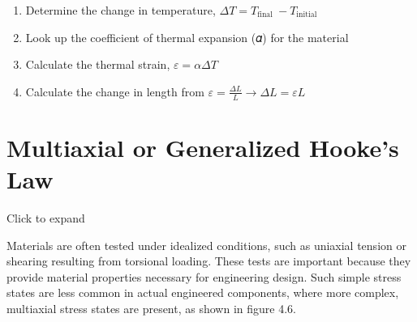 \documentclass[
  letterpaper,
  DIV=11,
  numbers=noendperiod]{scrreprt}
\begin{document}
\begin{tcolorbox}[enhanced jigsaw, breakable, opacityback=0, toptitle=1mm, left=2mm, colback=white, opacitybacktitle=0.6, colframe=quarto-callout-warning-color-frame, titlerule=0mm, arc=.35mm, leftrule=.75mm, bottomtitle=1mm, colbacktitle=quarto-callout-warning-color!10!white, rightrule=.15mm, title={Step-by-step: Thermal Strain}, bottomrule=.15mm, toprule=.15mm, coltitle=black]

\begin{enumerate}
\def\labelenumi{\arabic{enumi}.}
\item
  Determine the change in temperature,
  \(\Delta T=T_{\text {final }}-T_{\text {initial }}\)
\item
  Look up the coefficient of thermal expansion (𝛼) for the material
\item
  Calculate the thermal strain, \(\varepsilon=\alpha \Delta T\)
\item
  Calculate the change in length from
  \(\varepsilon=\frac{\Delta L}{L} \rightarrow \Delta L=\varepsilon L\)
\end{enumerate}

\end{tcolorbox}

\section{Multiaxial or Generalized Hooke's Law}\label{sec-4.7}

Click to expand

Materials are often tested under idealized conditions, such as uniaxial
tension or shearing resulting from torsional loading. These tests are
important because they provide material properties necessary for
engineering design. Such simple stress states are less common in actual
engineered components, where more complex, multiaxial stress states are
present, as shown in figure 4.6.
\end{document}
